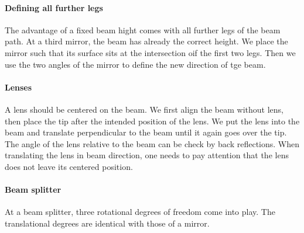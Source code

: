 \paragraph*{Defining all further legs} The advantage of a fixed beam hight comes with all further legs of the beam path. At a third mirror, the beam has already the correct height. We place the mirror such that its surface sits at the intersection oif the first two legs. Then we use the two angles of the mirror to define the new direction of tge beam.

\paragraph*{Lenses} A lens should be centered on the beam. We first align the beam without lens, then place the tip after the intended position of the lens. We put the lens into the beam and translate perpendicular to the beam until it again goes over the tip. The angle of the lens relative to the beam can be check by back reflections. When translating the lens in beam direction, one needs to pay attention that the lens does not leave its centered position.

\paragraph*{Beam splitter} At a beam splitter, three rotational degrees of freedom come into play. The translational degrees are identical with those of a mirror.






\printbibliography[segment=\therefsegment,heading=subbibliography]
